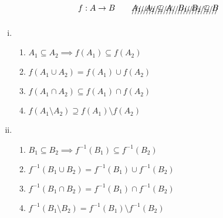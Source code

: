\begin{frame}{}
  \begin{theorem}
    \[
      f: A \to B \qquad
      \xout{A_1, A_2 \subseteq A,\; B_1, B_2 \subseteq B}
    \]

    \vspace{-0.10cm}
    \begin{enumerate}[(i)]
      \setlength{\itemsep}{10pt}
      \item {}
        \begin{enumerate}[(1)]
          \setlength{\itemsep}{4pt}
          \item $A_1 \subseteq A_2 \implies f(A_1) \subseteq f(A_2)$
          \item $f(A_1 \cup A_2) = f(A_1) \cup f(A_2)$
          \item $f(A_1 \cap A_2) \subseteq f(A_1) \cap f(A_2)$
          \item $f(A_1 \setminus A_2) \supseteq f(A_1) \setminus f(A_2)$
        \end{enumerate}
      \item {}
        \begin{enumerate}[(1)]
          \setlength{\itemsep}{4pt}
          \setcounter{enumii}{4}
          \item $B_1 \subseteq B_2 \implies f^{-1}(B_1) \subseteq f^{-1}(B_2)$
          \item $f^{-1}(B_1 \cup B_2) = f^{-1}(B_1) \cup f^{-1}(B_2)$
          \item $f^{-1}(B_1 \cap B_2) = f^{-1}(B_1) \cap f^{-1}(B_2)$
          \item $f^{-1}(B_1 \setminus B_2) = f^{-1}(B_1) \setminus f^{-1}(B_2)$
        \end{enumerate}
    \end{enumerate}
  \end{theorem}
\end{frame}

